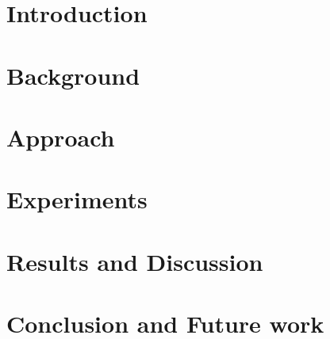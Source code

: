 \documentclass[12pt,twoside,openright]{article}
\makeatletter
\def\cleardoublepage{\clearpage\if@twoside \ifodd\c@page\else
    \hbox{}
    \thispagestyle{empty}
    \newpage
    \if@twocolumn\hbox{}\newpage\fi\fi\fi}
\makeatother
\begin{document}

\cleardoublepage


%

%

\tableofcontents
\newpage

\section{Introduction}

\newpage

\section{Background}

\newpage

\section{Approach}

\newpage

\section{Experiments}

\newpage

\section{Results and Discussion}

\newpage

\section{Conclusion and Future work}

\newpage



%

%
%
%
\end{document}
